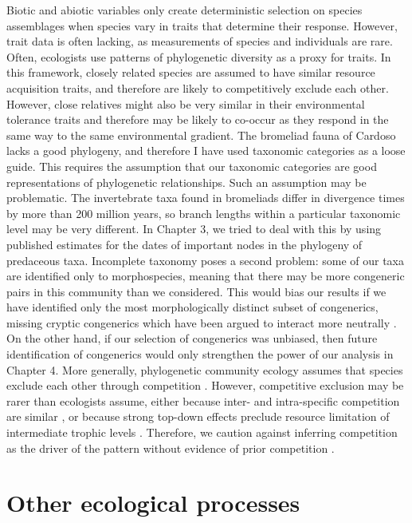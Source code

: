 Biotic and abiotic variables only create deterministic selection on
species assemblages when species vary in traits that determine their
response. However, trait data is often lacking, as measurements of
species and individuals are rare. Often, ecologists use patterns of
phylogenetic diversity as a proxy for traits. In this framework, closely
related species are assumed to have similar resource acquisition traits,
and therefore are likely to competitively exclude each other. However,
close relatives might also be very similar in their environmental
tolerance traits and therefore may be likely to co-occur as they respond
in the same way to the same environmental gradient. The bromeliad fauna
of Cardoso lacks a good phylogeny, and therefore I have used taxonomic
categories as a loose guide. This requires the assumption that our
taxonomic categories are good representations of phylogenetic
relationships. Such an assumption may be problematic. The invertebrate
taxa found in bromeliads differ in divergence times by more than 200
million years, so branch lengths within a particular taxonomic level may
be very different. In Chapter 3, we tried to deal with this by using
published estimates for the dates of important nodes in the phylogeny of
predaceous taxa. Incomplete taxonomy poses a second problem: some of our
taxa are identified only to morphospecies, meaning that there may be
more congeneric pairs in this community than we considered. This would
bias our results if we have identified only the most morphologically
distinct subset of congenerics, missing cryptic congenerics which have
been argued to interact more neutrally \citep{Siepielski2010}. On the
other hand, if our selection of congenerics was unbiased, then future
identification of congenerics would only strengthen the power of our
analysis in Chapter 4. More generally, phylogenetic community ecology
assumes that species exclude each other through competition
\citep{Narwani2015}. However, competitive exclusion may be rarer than
ecologists assume, either because inter- and intra-specific competition
are similar \citep{Hubbell1997}, or because strong top-down effects
preclude resource limitation of intermediate trophic levels
\citep{Holt2004}. Therefore, we caution against inferring competition as
the driver of the pattern without evidence of prior competition
\citep{CahillJr.2008}.

\section{Other ecological processes}\label{other-processes}

